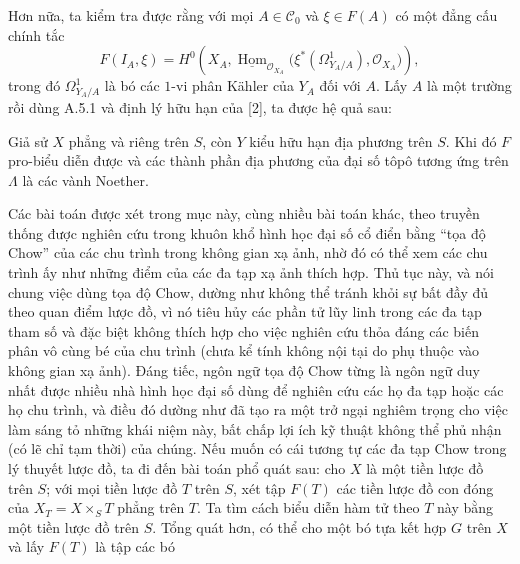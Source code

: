 Hơn nữa, ta kiểm tra được rằng với mọi $A\in\mathcal C_0$ và $\xi\in F(A)$ có
một đẳng cấu chính tắc
\[
  F(I_A,\xi)=H^0\!\left(
    X_A,
    \underline{\operatorname{Hom}}_{\mathcal O_{X_A}}
    \bigl(\xi^*(\Omega^1_{Y_A/A}),\mathcal O_{X_A}\bigr)
  \right),
\]
trong đó $\Omega^1_{Y_A/A}$ là bó các $1$-vi phân Kähler của $Y_A$ đối với
$A$. Lấy $A$ là một trường rồi dùng A.5.1 và định lý hữu hạn của [2], ta được
hệ quả sau:

 Giả sử $X$ phẳng và riêng trên $S$, còn $Y$ kiểu hữu hạn địa
phương trên $S$. Khi đó $F$ pro-biểu diễn được và các thành phần địa phương của
đại số tôpô tương ứng trên $\Lambda$ là các vành Noether.

 Các bài toán được xét trong mục này, cùng nhiều bài toán
khác, theo truyền thống được nghiên cứu trong khuôn khổ hình học đại số cổ điển
bằng ``tọa độ Chow'' của các chu trình trong không gian xạ ảnh, nhờ đó có thể
xem các chu trình ấy như những điểm của các đa tạp xạ ảnh thích hợp. Thủ tục
này, và nói chung việc dùng tọa độ Chow, dường như không thể tránh khỏi sự bất
đầy đủ theo quan điểm lược đồ, vì nó tiêu hủy các phần tử lũy linh trong các đa
tạp tham số và đặc biệt không thích hợp cho việc nghiên cứu thỏa đáng các biến
phân vô cùng bé của chu trình (chưa kể tính không nội tại do phụ thuộc vào
không gian xạ ảnh). Đáng tiếc, ngôn ngữ tọa độ Chow từng là ngôn ngữ duy nhất
được nhiều nhà hình học đại số dùng để nghiên cứu các họ đa tạp hoặc các họ
chu trình, và điều đó dường như đã tạo ra một trở ngại nghiêm trọng cho việc
làm sáng tỏ những khái niệm này, bất chấp lợi ích kỹ thuật không thể phủ nhận
(có lẽ chỉ tạm thời) của chúng. Nếu muốn có cái tương tự các đa tạp Chow trong
lý thuyết lược đồ, ta đi đến bài toán phổ quát sau: cho $X$ là một tiền lược đồ
trên $S$; với mọi tiền lược đồ $T$ trên $S$, xét tập $F(T)$ các tiền lược đồ
con đóng của $X_T=X\times_ST$ phẳng trên $T$. Ta tìm cách biểu diễn hàm tử theo
$T$ này bằng một tiền lược đồ trên $S$. Tổng quát hơn, có thể cho một bó tựa
kết hợp $G$ trên $X$ và lấy $F(T)$ là tập các bó

